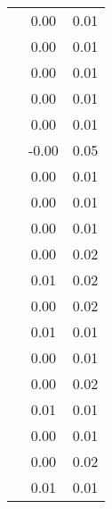 \begin{table}
\begin{tabular}{c|cc|}
\multicolumn{1}{|c|}{} & \multicolumn{1}{|c|}{      0.00} & \multicolumn{1}{|c|}{      0.01} \\ 
\multicolumn{1}{|c|}{} & \multicolumn{1}{|c|}{      0.00} & \multicolumn{1}{|c|}{      0.01} \\ 
\multicolumn{1}{|c|}{} & \multicolumn{1}{|c|}{      0.00} & \multicolumn{1}{|c|}{      0.01} \\ 
\multicolumn{1}{|c|}{} & \multicolumn{1}{|c|}{      0.00} & \multicolumn{1}{|c|}{      0.01} \\ 
\multicolumn{1}{|c|}{} & \multicolumn{1}{|c|}{      0.00} & \multicolumn{1}{|c|}{      0.01} \\ 
\multicolumn{1}{|c|}{} & \multicolumn{1}{|c|}{     -0.00} & \multicolumn{1}{|c|}{      0.05} \\ 
\multicolumn{1}{|c|}{} & \multicolumn{1}{|c|}{      0.00} & \multicolumn{1}{|c|}{      0.01} \\ 
\multicolumn{1}{|c|}{} & \multicolumn{1}{|c|}{      0.00} & \multicolumn{1}{|c|}{      0.01} \\ 
\multicolumn{1}{|c|}{} & \multicolumn{1}{|c|}{      0.00} & \multicolumn{1}{|c|}{      0.01} \\ 
\multicolumn{1}{|c|}{} & \multicolumn{1}{|c|}{      0.00} & \multicolumn{1}{|c|}{      0.02} \\ 
\multicolumn{1}{|c|}{} & \multicolumn{1}{|c|}{      0.01} & \multicolumn{1}{|c|}{      0.02} \\ 
\multicolumn{1}{|c|}{} & \multicolumn{1}{|c|}{      0.00} & \multicolumn{1}{|c|}{      0.02} \\ 
\multicolumn{1}{|c|}{} & \multicolumn{1}{|c|}{      0.01} & \multicolumn{1}{|c|}{      0.01} \\ 
\multicolumn{1}{|c|}{} & \multicolumn{1}{|c|}{      0.00} & \multicolumn{1}{|c|}{      0.01} \\ 
\multicolumn{1}{|c|}{} & \multicolumn{1}{|c|}{      0.00} & \multicolumn{1}{|c|}{      0.02} \\ 
\multicolumn{1}{|c|}{} & \multicolumn{1}{|c|}{      0.01} & \multicolumn{1}{|c|}{      0.01} \\ 
\multicolumn{1}{|c|}{} & \multicolumn{1}{|c|}{      0.00} & \multicolumn{1}{|c|}{      0.01} \\ 
\multicolumn{1}{|c|}{} & \multicolumn{1}{|c|}{      0.00} & \multicolumn{1}{|c|}{      0.02} \\ 
\multicolumn{1}{|c|}{} & \multicolumn{1}{|c|}{      0.01} & \multicolumn{1}{|c|}{      0.01} \\ 

\end{tabular}
\end{table}
